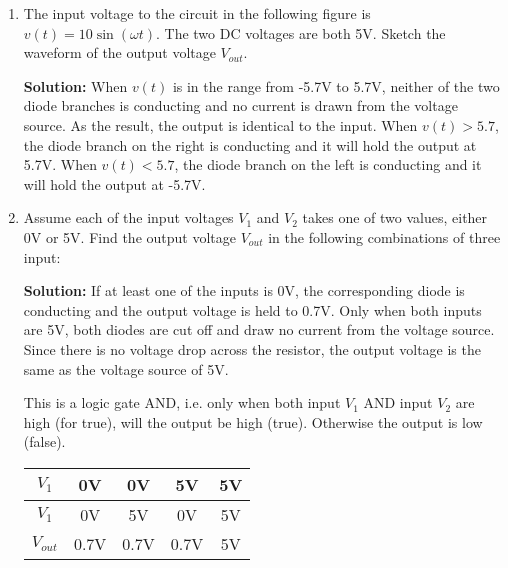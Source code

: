 \begin{enumerate}

{\bf Solution:} This is a full-wave rectifier circuit, which turns the
negative half cycle of the input to positive, so that the period of the
output is $T=1/120=0.0083S$. The charge of the capacitor reduced during
this period is $Q=IT=2A\times 0.083 S=0.0167 C$. If the voltage across
the capacitor is dropped by less than $V_C=0.05\times 12=0.6V$, its 
capacitance has to be greater than $C=Q/V_C=0.0167/0.6=0.0278 F$.

The peak voltage of input is $115\times \sqrt{2}=162.6$, the peak voltage
of the output is $12V$, the turn ratio of the transformer is 
$162.6/12=13.55$. 

\item The input voltage to the circuit in the following figure is
$v(t)=10 \sin (\omega t)$. The two DC voltages are both 5V. Sketch the
waveform of the output voltage $V_{out}$.


{\bf Solution:} When $v(t)$ is in the range from -5.7V to 5.7V, neither
of the two diode branches is conducting and no current is drawn from the
voltage source. As the result, the output is identical to the input.
When $v(t)>5.7$, the diode branch on the right is conducting and it
will hold the output at 5.7V. When $v(t)<5.7$, the diode branch on the
left is conducting and it will hold the output at -5.7V.

\item Assume each of the input voltages $V_1$ and $V_2$ takes one of
two values, either 0V or 5V. Find the output voltage $V_{out}$ in the
following combinations of three input:
 
{\bf Solution:}  If at least one of the inputs is 0V, the corresponding
diode is conducting and the output voltage is held to 0.7V. Only when
both inputs are 5V, both diodes are cut off and draw no current from the
voltage source. Since there is no voltage drop across the resistor, the
output voltage is the same as the voltage source of 5V. 

This is a logic gate AND, i.e. only when both input $V_1$ AND input $V_2$
are high (for true), will the output be high (true). Otherwise the output
is low (false).

\begin{tabular}{c||c c c c}\hline\hline
$V_1$ & 0V & 0V & 5V & 5V \\ \hline
$V_1$ & 0V & 5V & 0V & 5V \\ \hline
$V_{out}$ & 0.7V & 0.7V & 0.7V & 5V  &   \\
\end{tabular}



\end{enumerate}


